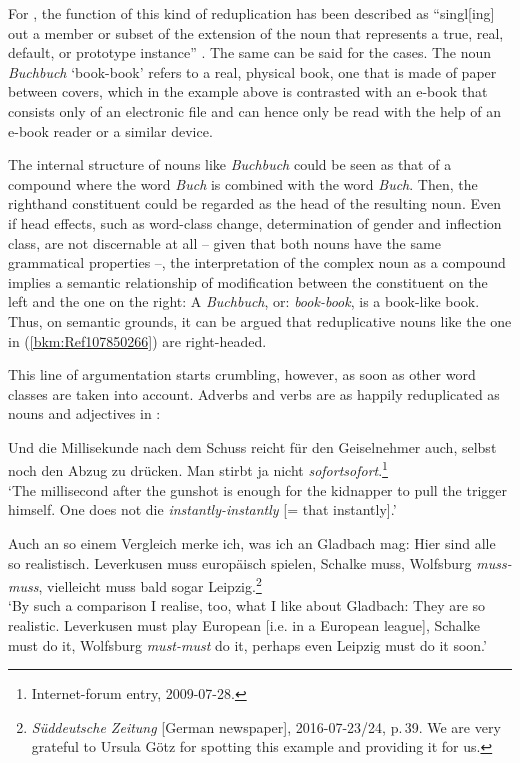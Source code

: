 \documentclass[output=paper
  ,nobabel
  ,draftmode
  ,colorlinks, citecolor=brown
]{langscibook}
\begin{document}
\enlargethispage{2pt}
\noindent
For , the function of this kind of reduplication has been described as ``singl[ing] out a
member or subset of the extension of the noun that represents a true, real, default, or prototype
instance'' \citep[48]{Horn1993}. The same can be said for the  cases. The noun \emph{Buchbuch}
`book-book' refers to a real, physical book, one that is made of paper between covers, which in the
example above is contrasted with an e-book that consists only of an electronic file and can hence
only be read with the help of an e-book reader or a similar device.

The internal structure of nouns like \emph{Buchbuch} could be seen as that of a compound where the
word \emph{Buch} is combined with the word \emph{Buch}. Then, the righthand constituent could be
regarded as the head of the resulting noun. Even if head effects, such as word-class change,
determination of gender and inflection class, are not discernable at all – given that both nouns
have the same grammatical properties –, the interpretation of the complex noun as a compound implies
a semantic relationship of modification between the constituent on the left and the one on the
right: A \emph{Buchbuch}, or: \emph{book-book}, is a book-like book. Thus, on semantic grounds, it
can be argued that reduplicative nouns like the one in (\ref{bkm:Ref107850266}) are right-headed.

This line of argumentation starts crumbling, however, as soon as other word classes are taken into
account. Adverbs and verbs are as happily reduplicated as nouns and adjectives in :

\ea
\label{bkm:Ref107864878}%
Und die Millisekunde nach dem Schuss reicht für den Geiselnehmer auch, selbst noch den Abzug zu drücken. Man stirbt ja nicht \emph{sofortsofort}.\footnote{Internet-forum entry, 2009-07-28.}\\
`The millisecond after the gunshot is enough for the kidnapper to pull the trigger himself. One does not die \emph{instantly-instantly} [= that instantly].'
\z

\ea
\label{bkm:Ref107850306}%
Auch an so einem Vergleich merke ich, was ich an Gladbach mag: Hier sind alle so realistisch. Leverkusen muss europäisch spielen, Schalke muss, Wolfsburg \emph{muss-muss}, vielleicht muss bald sogar Leipzig.\footnote{\emph{Süddeutsche Zeitung} [German newspaper], 2016-07-23/24, p.\,39. We are very grateful to Ursula Götz for spotting this example and providing it for us.}\\
`By such a comparison I realise, too, what I like about Gladbach: They are so realistic. Leverkusen must play European [i.e. in a European league], Schalke must do it, Wolfsburg \emph{must-must} do it, perhaps even Leipzig must do it soon.'
\z
\end{document}
